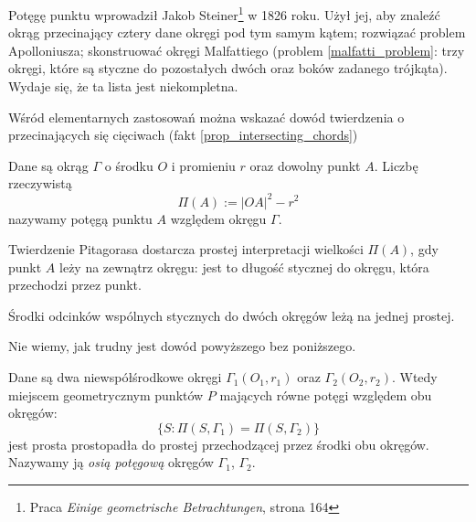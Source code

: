 
Potęgę punktu wprowadził Jakob Steiner\footnote{Praca \emph{Einige geometrische Betrachtungen}, strona 164} w 1826 roku.
%
Użył jej, aby znaleźć okrąg przecinający cztery dane okręgi pod tym samym kątem; rozwiązać problem Apolloniusza; skonstruować okręgi Malfattiego (problem \ref{malfatti_problem}: trzy okręgi, które są styczne do pozostałych dwóch oraz boków zadanego trójkąta).
%
%
Wydaje się, że ta lista jest niekompletna.

Wśród elementarnych zastosowań można wskazać dowód twierdzenia o przecinających się cięciwach (fakt \ref{prop_intersecting_chords})

\begin{definition}
	\label{def_power_point}
	Dane są okrąg $\Gamma$ o środku $O$ i promieniu $r$ oraz dowolny punkt $A$.
	Liczbę rzeczywistą
	\begin{equation}
		\Pi(A) := |OA|^2 - r^2
	\end{equation}
	nazywamy potęgą punktu $A$ względem okręgu $\Gamma$.
\end{definition}

Twierdzenie Pitagorasa dostarcza prostej interpretacji wielkości $\Pi(A)$, gdy punkt $A$ leży na zewnątrz okręgu: jest to długość stycznej do okręgu, która przechodzi przez punkt.

\begin{proposition}
	Środki odcinków wspólnych stycznych do dwóch okręgów leżą na jednej prostej. %
\end{proposition}

Nie wiemy, jak trudny jest dowód powyższego bez poniższego.

\begin{proposition}
\label{guzicki_6_11}%
    Dane są dwa niewspółśrodkowe okręgi $\Gamma_1(O_1, r_1)$ oraz $\Gamma_2(O_2, r_2)$.
    Wtedy miejscem geometrycznym punktów $P$ mających równe potęgi względem obu okręgów:
	\begin{equation}
		\{S : \Pi(S, \Gamma_1) = \Pi(S, \Gamma_2)\}
	\end{equation}
	jest prosta prostopadła do prostej przechodzącej przez środki obu okręgów.
	Nazywamy ją \emph{osią potęgową} okręgów $\Gamma_1$, $\Gamma_2$.
\end{proposition}

